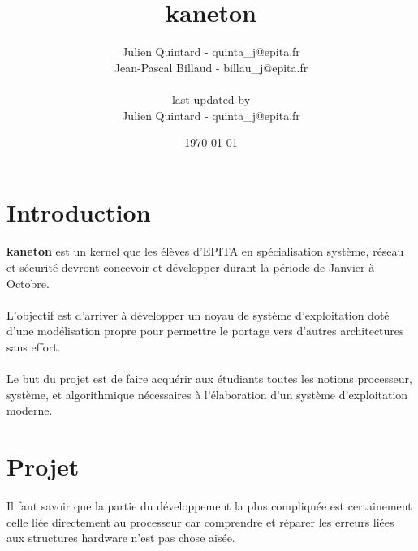 \documentclass[10pt,a4wide]{article}
\title{kaneton}
\author{Julien Quintard - \small{quinta\_j@epita.fr} \\
        Jean-Pascal Billaud - \small{billau\_j@epita.fr} \\ \\
        \small{last updated by} \\
        Julien Quintard - \small{quinta\_j@epita.fr}}
\date{\today}
\begin{document}
\maketitle

\tableofcontents

\newpage

\section{Introduction}

\paragraph{}

\textbf{kaneton} est un kernel que les \'el\`eves d'EPITA en sp\'ecialisation
syst\`eme, r\'eseau et s\'ecurit\'e devront concevoir et d\'evelopper durant
la p\'eriode de Janvier \`a Octobre.

\paragraph{}

L'objectif est d'arriver \`a d\'evelopper un noyau de syst\`eme d'exploitation
dot\'e d'une mod\'elisation propre pour permettre le portage vers d'autres
architectures sans effort.

\paragraph{}

Le but du projet est de faire acqu\'erir aux \'etudiants toutes les notions
processeur, syst\`eme, et algorithmique n\'ecessaires \`a l'\'elaboration
d'un syst\`eme d'exploitation moderne.

\newpage

\section{Projet}

\paragraph{}

Il faut savoir que la partie du d\'eveloppement la plus compliqu\'ee est
certainement celle li\'ee directement au processeur car comprendre
et r\'eparer les erreurs li\'ees aux structures hardware n'est pas chose
ais\'ee.
\end{document}
